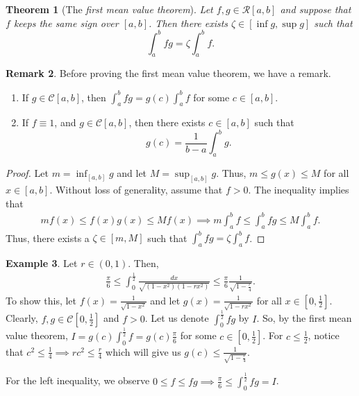 \documentclass[15pt,a4paper]{book}
\newtheorem{theorem}{Theorem}[chapter]
\theoremstyle{definition}
\newtheorem{example}[theorem]{Example}
\newtheorem{remark}[theorem]{Remark}
\newcommand{\eax}[1]{\emph{#1}\index{#1}} %
\newcommand{\cR}{\mathcal{R}}
\newcommand{\cC}{\mathcal{C}}
\begin{document}
\begin{theorem}[The \eax{first mean value theorem}]
    Let $f,g \in \cR[a,b]$ and suppose that $f$ keeps the same sign over $[a,b]$. Then there exists $\zeta \in [\inf g, \sup g]$ such that
    \begin{equation*}
        \int_{a}^{b} fg = \zeta \int_{a}^{b} f.
    \end{equation*}
\end{theorem}
\begin{remark} Before proving the first mean value theorem, we have a remark.
    \begin{enumerate}
        \item If $g \in \cC[a,b]$, then $\int_{a}^{b} fg = g(c) \int_{a}^{b} f$ for some $c \in [a,b]$.
        \item If $f \equiv 1$, and $g \in \cC[a,b]$, then there exists $c \in [a,b]$ such that
        \begin{equation*}
            g(c) = \frac{1}{b-a} \int_{a}^{b} g.
        \end{equation*}
    \end{enumerate}
\end{remark}
\begin{proof}
    Let $m = \inf_{[a,b]} g$ and let $M = \sup_{[a,b]} g$. Thus, $m \leq g(x) \leq M$ for all $x \in [a,b]$. Without loss of generality, assume that $f > 0$. The inequality implies that
    \begin{align}
        mf(x) \leq f(x) g(x) \leq M f(x) \implies m\int_{a}^{b} f \leq \int_{a}^{b} fg \leq M \int_{a}^{b} f.
    \end{align}
    Thus, there exists a $\zeta \in [m,M]$ such that $\int_{a}^{b} fg = \zeta \int_{a}^{b} f$.
\end{proof}

\begin{example}
    Let $r \in (0,1)$. Then,
    \begin{align}
        \frac{\pi}{6} \leq \int_{0}^{\frac{1}{2}} \frac{dx}{\sqrt{(1-x^{2})(1-rx^{2})}} \leq \frac{\pi}{6} \frac{1}{\sqrt{1-\frac{r}{4}}}.
    \end{align}
    To show this, let $f(x) = \frac{1}{\sqrt{1-x^{2}}}$ and let $g(x) = \frac{1}{\sqrt{1-rx^{2}}}$ for all $x \in [0,\frac{1}{2}]$. Clearly, $f,g \in \cC[0,\frac{1}{2}]$ and $f > 0$. Let us denote $\int_{0}^{\frac{1}{2}} fg$ by $I$. So, by the first mean value theorem, $I = g(c) \int_{0}^{\frac{1}{2}} f = g(c) \frac{\pi}{6}$ for some $c \in [0,\frac{1}{2}]$. For $c \leq \frac{1}{2}$, notice that $c^{2} \leq \frac{1}{4} \implies rc^{2} \leq \frac{r}{4}$ which will give us $g(c) \leq \frac{1}{\sqrt{1-\frac{r}{4}}}$.

    For the left inequality, we observe $0 \leq f \leq fg \implies \frac{\pi}{6} \leq \int_{0}^{\frac{1}{2}} fg = I$.
\end{example}
\end{document}
